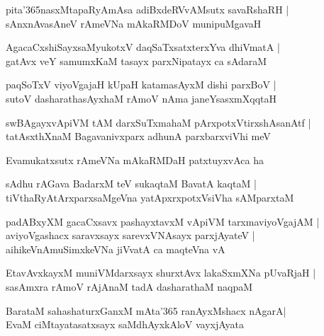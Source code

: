 \begin{shloka}
pita\char'365nasxMtapaRyAmAsa adiBxdeRVvAMsutx savaRshaRH |\\
sAnxnAvasAneV rAmeVNa mAkaRMDoV munipuMgavaH 
\end{shloka}

\begin{shloka}
AgacaCx\R shiSayxsaMyukotxV daqSaTxsatxterxYva dhiVmatA |\\
gatAvx veY samumxKaM tasayx parxNipatayx ca sAdaraM 
\end{shloka}

\begin{shloka}
paqSoTxV viyoVgajaH kUpaH katamasAyxM dishi parxBoV |\\
sutoV dasharathasAyxhaM rAmoV nAma janeYsasxmXqqtaH
\end{shloka}

\begin{shloka}
swBAgayxvApiVM tAM darxSuTxmahaM pArxpotxVtirxshAsanAtf |\\
tatAsxthXnaM Bagavanivxparx adhunA parxbarxviVhi meV
\end{shloka}

\begin{shloka}
Evamukatxsutx rAmeVNa mAkaRMDaH patxtuyxvAca ha
\end{shloka}

\begin{shloka}
sAdhu rAGava BadarxM teV sukaqtaM BavatA kaqtaM |\\
tiVthaRyAtArxparxsaMgeVna yatApxrxpotxVsiVha sAMparxtaM
\end{shloka}

\begin{shloka}
padABxyXM gacaCxsavx pashayxtavxM vApiVM tarxmaviyoVgajAM |\\
aviyoVgashacx saravxsayx sarevxVNAsayx parxjAyateV |\\
aihikeVnAmuSimxkeVNa jiVvatA ca maqteVna vA 
\end{shloka}

\begin{shloka}
EtavAvxkayxM muniVMdarxsayx shurxtAvx lakaSxmXNa pUvaRjaH |\\
sasAmxra rAmoV rAjAnaM tadA dasharathaM naqpaM 
\end{shloka}

\begin{shloka}
BarataM sahashaturxGanxM mAta\char'365 ranAyxMshacx nAgarA\R |\\
EvaM ciMtayatasatxsayx saMdhAyxkAloV vayxjAyata
\end{shloka}


